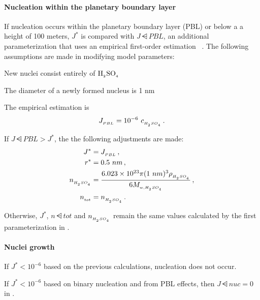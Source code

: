 \paragraph{Nucleation within the planetary boundary layer} 

If nucleation occurs within the planetary boundary layer (PBL) or below a
a height of 100 meters, $J^*$ is compared with $J\dsub{PBL}$, an additional
parameterization that uses an empirical first-order estimation
~\cite{sihto-2006-acp,wang-2009-acp}. The following assumptions are made in
modifying model parameters:

\begin{assume}
  New nuclei consist entirely of $\rm H_{_2}SO_{_4}$
\end{assume}

\begin{assume}
  The diameter of a newly formed nucleus is 1 nm
\end{assume}

The empirical estimation is
\begin{equation}
  J_{_{PBL}} = 10^{-6}~c_{_{H_{_2}SO_{_4}}} \,.
\end{equation}

If $J\dsub{PBL} > J^*$, the the following adjustments are made:
\begin{align}
  J^* &= J_{_{PBL}} \,, \\
  r^* &= 0.5~nm \,, \\
  n_{_{H_{_2}SO_{_4}}} &= \frac{6.023 \times 10^{23} \pi (1~nm)^3
                  \rho_{_{H_{_2}SO_{_4}}}}{6 M_{_{w,H_{_2}SO_{_4}}}} \,, \\
  n_{_{tot}} &= n_{_{H_{_2}SO_{_4}}} \,.
\end{align}

Otherwise, $J^*$, $n\dsub{tot}$ and $n_{_{H_{_2}SO_{_4}}}$ remain the same values
calculated by the first parameterization in .

\paragraph{Nuclei growth} 

If $J^* < 10^{-6}$ based on the previous calculations, nucleation does not
occur.

\begin{assume}
  If $J^* < 10^{-6}$ based on binary nucleation and from PBL effects, then
  $J\dsub{nuc} = 0$ in .
\end{assume}

